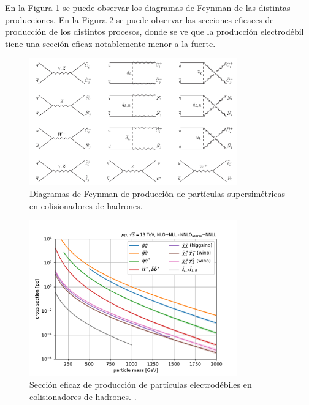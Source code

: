 En la Figura \ref{fig:sp_production} se puede observar los diagramas de Feynman de las distintas producciones. En la Figura \ref{fig:susy_xs} se puede observar las secciones eficaces de producción de los distintos procesos, donde se ve que la producción electrodébil tiene una sección eficaz notablemente menor a la fuerte.

\begin{figure}
  \centering
  \includegraphics[width=0.8\textwidth]{images/sp_production.png}
  \caption{Diagramas de Feynman de producción de partículas supersimétricas en colisionadores de hadrones. }
  \label{fig:sp_production}
\end{figure}

\begin{figure}
  \centering
  \includegraphics[width=0.8\textwidth]{images/SUSY_xsecs_13TeV_overview.pdf}
  \caption{Sección eficaz de producción de partículas electrodébiles en colisionadores de hadrones. .}
  \label{fig:susy_xs}
\end{figure}
